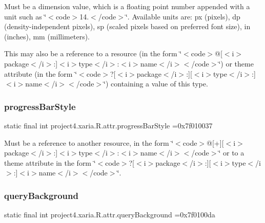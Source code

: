 Must be a dimension value, which is a floating point number appended with a unit such as \char`\"{}$<$code$>$14.\+5sp$<$/code$>$\char`\"{}. Available units are\+: px (pixels), dp (density-\/independent pixels), sp (scaled pixels based on preferred font size), in (inches), mm (millimeters). 

This may also be a reference to a resource (in the form \char`\"{}$<$code$>$@\mbox{[}$<$i$>$package$<$/i$>$\+:\mbox{]}$<$i$>$type$<$/i$>$\+:$<$i$>$name$<$/i$>$$<$/code$>$\char`\"{}) or theme attribute (in the form \char`\"{}$<$code$>$?\mbox{[}$<$i$>$package$<$/i$>$\+:\mbox{]}\mbox{[}$<$i$>$type$<$/i$>$\+:\mbox{]}$<$i$>$name$<$/i$>$$<$/code$>$\char`\"{}) containing a value of this type. \mbox{\label{classproject4_1_1xaria_1_1R_1_1attr_ad78b5154b765134ed406f888a1da6534}} 
\subsubsection{\texorpdfstring{progress\+Bar\+Style}{progressBarStyle}}
{\footnotesize\ttfamily static final int project4.\+xaria.\+R.\+attr.\+progress\+Bar\+Style =0x7f010037\hspace{0.3cm}{\ttfamily [static]}}

Must be a reference to another resource, in the form \char`\"{}$<$code$>$@\mbox{[}+\mbox{]}\mbox{[}$<$i$>$package$<$/i$>$\+:\mbox{]}$<$i$>$type$<$/i$>$\+:$<$i$>$name$<$/i$>$$<$/code$>$\char`\"{} or to a theme attribute in the form \char`\"{}$<$code$>$?\mbox{[}$<$i$>$package$<$/i$>$\+:\mbox{]}\mbox{[}$<$i$>$type$<$/i$>$\+:\mbox{]}$<$i$>$name$<$/i$>$$<$/code$>$\char`\"{}. \mbox{\label{classproject4_1_1xaria_1_1R_1_1attr_a84167c3d8a228a78b735c0f672d92e41}} 
\subsubsection{\texorpdfstring{query\+Background}{queryBackground}}
{\footnotesize\ttfamily static final int project4.\+xaria.\+R.\+attr.\+query\+Background =0x7f0100da\hspace{0.3cm}{\ttfamily [static]}}

